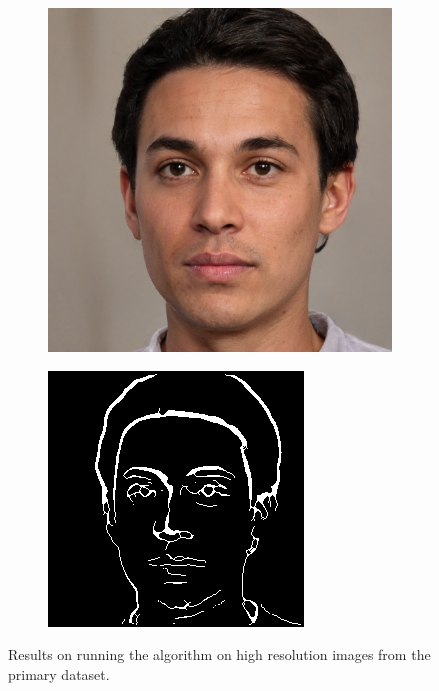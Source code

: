 \documentclass{70_styles/svproc}
\begin{document}
\begin{figure}
\begin{subfigure}[H]{0.2\textwidth}
     \end{subfigure}
    \par\medskip
     \begin{subfigure}[H]{0.2\textwidth}
         \centering
         \includegraphics[width=\textwidth]{70_figures/seed7915.png}
     \end{subfigure}
     \begin{subfigure}[H]{0.2\textwidth}
         \centering
         \includegraphics[width=\textwidth]{70_figures/seed7915_EM.png}
     \end{subfigure}
     \caption{Results on running the algorithm on high resolution images from the primary dataset.}
\end{figure}
\end{document}

